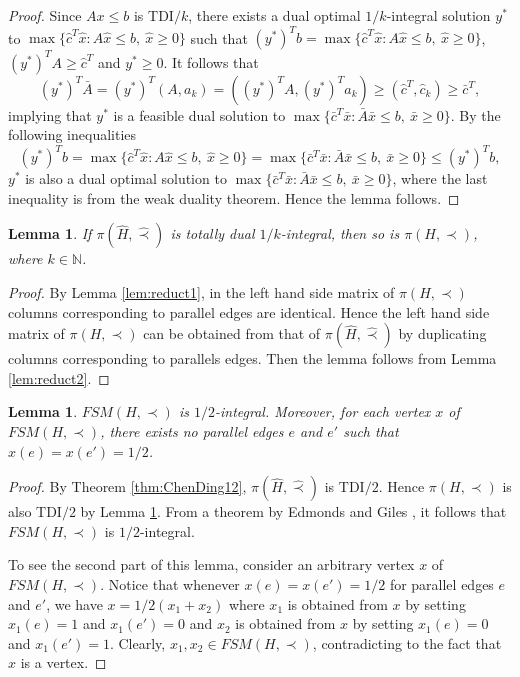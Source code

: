 \documentclass[11pt]{article}
\newtheorem{lemma}[theorem]{Lemma}
\numberwithin{theorem}{section}
\begin{document}
\begin{proof}
Since $Ax\leq b$ is TDI$/k$, there exists a dual optimal $1/k$-integral solution $y^*$ to $\max\{\hat{c}^T\hat{x}:A\hat{x}\leq b,~\hat{x}\geq 0\}$ such that $(y^*)^T b=\max\{\hat{c}^T \hat{x}:A\hat{x}\leq b,~\hat{x}\geq 0\}$, $(y^*)^T A\geq \hat{c}^T$ and $y^*\geq 0$. It follows that
\begin{equation*}
(y^*)^T \bar{A}=(y^*)^T (A,a_k)=((y^*)^T A,(y^*)^T a_k)\geq (\hat{c}^T,\hat{c}_k)\geq\bar{c}^T,
\end{equation*}
implying that $y^*$ is a feasible dual solution to $\max\{\bar{c}^T \bar{x}:\bar{A}\bar{x}\leq b,~\bar{x}\geq 0\}$. By the following inequalities
\begin{equation*}
(y^*)^T b=\max\{\hat{c}^T \hat{x}:A\hat{x}\leq b,~\hat{x}\geq 0\}=\max\{\bar{c}^T \bar{x}:\bar{A}\bar{x}\leq b,~\bar{x}\geq 0\}\leq (y^*)^T b,
\end{equation*} $y^*$ is also a dual optimal solution to $\max\{\bar{c}^T \bar{x}:\bar{A}\bar{x}\leq b,~\bar{x}\geq 0\}$, where the last inequality is from the weak duality theorem. Hence the lemma follows.
\end{proof}

\begin{lemma}
\label{lem:reduct3}
If $\pi(\hat{H},\hat\prec)$ is totally dual $1/k$-integral, then so is $\pi(H,\prec)$, where $k\in\mathbb{N}$.
\end{lemma}
\begin{proof}
By Lemma \ref{lem:reduct1}, in the left hand side matrix of $\pi(H,\prec)$ columns corresponding to parallel edges are identical. Hence the left hand side matrix of $\pi(H,\prec)$ can be obtained from that of $\pi(\hat{H},\hat\prec)$ by duplicating columns corresponding to parallels edges. Then the lemma follows from Lemma \ref{lem:reduct2}.
\end{proof}

\begin{lemma}
\label{lem:reduct4}
$FSM(H,\prec)$ is $1/2$-integral. Moreover, for each vertex $x$ of $FSM(H,\prec)$, there exists no parallel edges $e$ and $e'$ such that $x(e)=x(e')=1/2$.
\end{lemma}
\begin{proof}
By Theorem \ref{thm:ChenDing12}, $\pi(\hat{H},\hat\prec)$ is TDI$/2$. Hence $\pi(H,\prec)$ is also TDI$/2$ by Lemma \ref{lem:reduct3}. From a theorem by Edmonds and Giles \cite{EdmoGile77}, it follows that $FSM(H,\prec)$ is $1/2$-integral.

To see the second part of this lemma, consider an arbitrary vertex $x$ of $FSM(H,\prec)$. Notice that whenever $x(e)=x(e')=1/2$ for parallel edges $e$ and $e'$, we have $x=1/2 (x_1 + x_2)$ where $x_1$ is obtained from $x$ by setting $x_1 (e)=1$ and $x_1 (e')=0$ and $x_2$ is obtained from $x$ by setting $x_1 (e)=0$ and $x_1 (e')=1$. Clearly, $x_1, x_2\in FSM(H,\prec)$, contradicting to the fact that $x$ is a vertex.
\end{proof}
\end{document}
